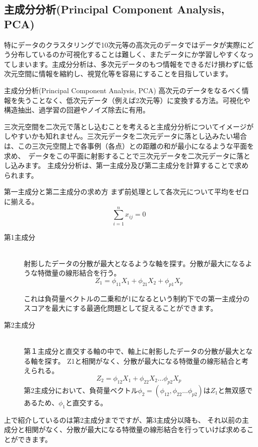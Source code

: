 \documentclass[uplatex]{jsarticle}
\begin{document}
\subsection{主成分分析(Principal Component Analysis, PCA)}
特にデータのクラスタリングで10次元等の高次元のデータではデータが実際にどう分布しているのか可視化することは難しく、またデータにか学習しやすくなってしまいます。主成分分析は、多次元データのもつ情報をできるだけ損わずに低次元空間に情報を縮約し、視覚化等を容易にすることを目指しています。\
\begin{itembox}[l]{主成分分析(Principal Component Analysis, PCA)}
  高次元のデータをなるべく情報を失うことなく、低次元データ（例えば2次元等）に変換する方法。可視化や構造抽出、過学習の回避やノイズ除去に有用。
\end{itembox}
三次元空間を二次元で落とし込むことを考えると主成分分析についてイメージがしやすいかも知れません。三次元データを二次元データに落とし込みたい場合は、この三次元空間上で各事例（各点）との距離の和が最小になるような平面を求め、\
データをこの平面に射影することで三次元データを二次元データに落とし込みます。
主成分分析は、第一主成分及び第二主成分を計算することで求められます。
\begin{itembox}[l]{第一主成分と第二主成分の求め方}
  まず前処理として各次元について平均をゼロに揃える。
  $$\sum_{i=1}^n x_{ij} = 0$$
  \begin{description}
    \item[第1主成分]\mbox{}\\
    射影したデータの分散が最大となるような軸を探す。分散が最大になるような特徴量の線形結合を行う。
    $$Z_1 = \phi_{11}X_1 + \phi_{21}X_2 + \phi_{p1}X_p$$

    これは負荷量ベクトルの二乗和が1になるという制約下での第一主成分のスコアを最大にする最適化問題として捉えることができます。
    \item[第2主成分]\mbox{}\\
    第１主成分と直交する軸の中で、軸上に射影したデータの分散が最大となる軸を探す。 Z1と相関がなく、分散が最大になる特徴量の線形結合と考えられる。\
    $$Z_2 = \phi_{12}X_1 + \phi_{22}X_2 \ldots \phi_{p2}X_p$$
    第2主成分において、負荷量ベクトル$\phi_2 = (\phi_{12}, \phi_{22} \ldots \phi_{p2})$は$Z_1$と無双感であるため、$\phi_1$と直交する。
  \end{description}
\end{itembox}
上で紹介しているのは第2主成分までですが、第3主成分以降も、 それ以前の主成分と相関がなく、分散が最大になる特徴量の線形結合を行っていけば求めることができます。
\end{document}
